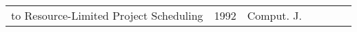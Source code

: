 {\begin{longtable}{llp{5cm}p{10cm}rp{3cm}l}
to Resource-Limited Project Scheduling & 1992 & Comput. J. & \cite{Tay92}\\\end{longtable}
}

